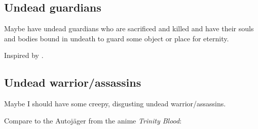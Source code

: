 \subsection{Undead guardians}
Maybe have undead guardians who are sacrificed and killed and have their souls and bodies bound in undeath to guard some object or place for eternity. 

Inspired by . 









\subsection{Undead warrior/assassins}
Maybe I should have some creepy, disgusting undead warrior/assassins. 

Compare to the Autoj\"ager from the anime \emph{Trinity Blood}: 












